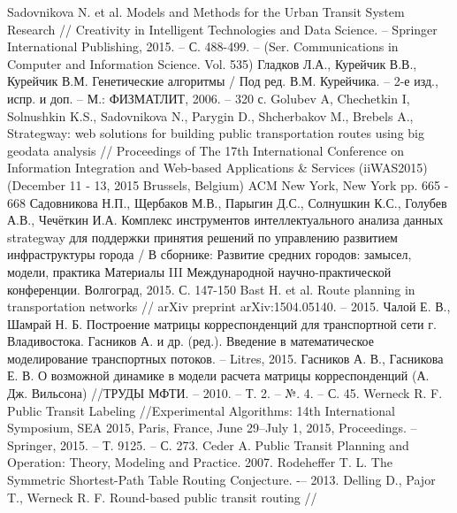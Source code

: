 \begin{thebibliography}{10}
     Sadovnikova N. et al. Models and Methods for the Urban Transit System Research //
        Creativity in Intelligent Technologies and Data Science. -- Springer International Publishing, 
        2015. -- С. 488-499. -- (Ser. Communications in Computer and Information Science. Vol. 535)
     Гладков Л.А., Курейчик В.В., Курейчик В.М. Генетические алгоритмы / 
        Под ред. В.М. Курейчика. -- 2-е изд., испр. и доп. -- М.: ФИЗМАТЛИТ, 2006. -- 320 с.
     Golubev A, Chechetkin I, Solnushkin K.S., Sadovnikova N., Parygin D., Shcherbakov M., 
        Brebels A., Strategway: web solutions for building public transportation routes using big geodata 
        analysis // Proceedings of The 17th International Conference on Information Integration and 
        Web-based Applications \& Services (iiWAS2015) (December 11 - 13, 2015 Brussels, Belgium) 
        ACM New York, New York pp. 665 - 668
     Садовникова Н.П., Щербаков М.В., Парыгин Д.С., Солнушкин К.С., Голубев А.В., 
        Чечёткин И.А. Комплекс инструментов интеллектуального анализа данных strategway для поддержки 
        принятия решений по управлению развитием инфраструктуры города / В сборнике: Развитие средних 
        городов: замысел, модели, практика Материалы III Международной научно-практической конференции. 
        Волгоград, 2015. С. 147-150
     Bast H. et al. Route planning in transportation networks //
        arXiv preprint arXiv:1504.05140. -- 2015.
     Чалой Е. В., Шамрай Н. Б. Построение матрицы корреспонденций для транспортной 
        сети г. Владивостока.
     Гасников А. и др. (ред.). Введение в математическое моделирование транспортных 
        потоков. -- Litres, 2015.
     Гасников А. В., Гасникова Е. В. О возможной динамике в модели расчета матрицы 
        корреспонденций (А. Дж. Вильсона) //ТРУДЫ МФТИ. -- 2010. -- Т. 2. -- №. 4. -- С. 45.
     Werneck R. F. Public Transit Labeling //Experimental Algorithms: 
        14th International Symposium, SEA 2015, Paris, France, June 29–July 1, 2015, 
        Proceedings. -- Springer, 2015. -- Т. 9125. -- С. 273.
     Ceder A. Public Transit Planning and Operation: Theory, Modeling and Practice. 2007.
     Rodeheffer T. L. The Symmetric Shortest-Path Table Routing 
        Conjecture. -– 2013.
     Delling D., Pajor T., Werneck R. F. Round-based public transit routing //

\end{thebibliography}
